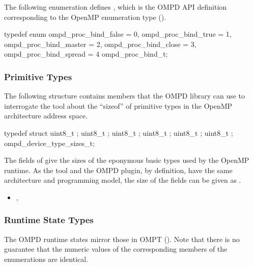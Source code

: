 The following enumeration defines , which is the OMPD
API definition corresponding to the OpenMP enumeration type
 ().

\format

\begin{ccppspecific}
\begin{ompSyntax}
typedef enum {
  ompd_proc_bind_false = 0,
  ompd_proc_bind_true = 1,
  ompd_proc_bind_master = 2,
  ompd_proc_bind_close = 3,
  ompd_proc_bind_spread = 4
} ompd_proc_bind_t;
\end{ompSyntax}
\end{ccppspecific}


\subsubsection{Primitive Types}
\label{subsubsec:ompd_device_type_sizes_t}
The following structure contains members that the OMPD library can use
to interrogate the tool about the ``sizeof'' of primitive types in the OpenMP architecture 
address space.

\format

\begin{ccppspecific}
\begin{ompSyntax}
typedef struct {
  uint8_t ;
  uint8_t ;
  uint8_t ;
  uint8_t ;
  uint8_t ;
  uint8_t ;
} ompd_device_type_sizes_t;
\end{ompSyntax}
\end{ccppspecific}


\descr
The fields of  give the sizes of
the eponymous basic types used by the OpenMP runtime.
As the tool and the OMPD plugin, by definition, have the same
architecture and programming model, the size of the fields can be given
as .

\crossreferences
\begin{itemize}
	\item
	, 
\end{itemize}

\subsubsection{Runtime State Types}

The OMPD runtime states mirror those in OMPT (). Note that there is no guarantee that 
the numeric values of the corresponding members of the enumerations are identical.

